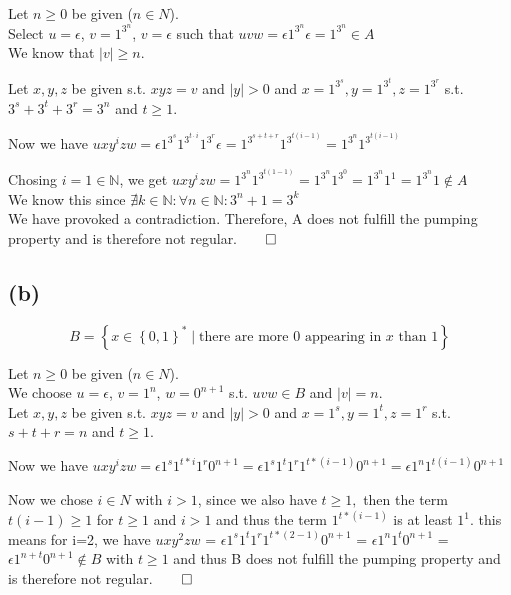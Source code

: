 Let $n \geq 0$ be given ($n \in N $).\\
Select $u = \epsilon$, $v=1^{3^{n}}$, $v=\epsilon$ such that $uvw = \epsilon 1^{3^{n}} \epsilon = 1^{3^{n}} \in A$\\
We know that $\lvert v \rvert \geq n$.

Let $x,y,z$ be given s.t. $xyz=v$ and $|y| > 0$ and $x=1^{3^{s}},y=1^{3^{t}},z=1^{3^{r}} $ s.t. $ 3^{s}+3^{t}+3^{r} = 3^{n} $ and $ t\geq 1$.

Now we have $uxy^izw = \epsilon 1^{3^{s}} 1^{3^{t\cdot i}} 1^{3^{r}} \epsilon = 1^{3^{s+t+r}} 1^{3^{t(i-1)}} = 1^{3^{n}}1^{3^{t(i-1)}}$

Chosing $i=1 \in \mathbb{N}$, we get $uxy^izw = 1^{3^{n}}1^{3^{t(1-1)}} = 1^{3^{n}}1^{3^{0}} = 1^{3^{n}}1^{1} = 1^{3^{n}}1 \notin A$\\
We know this since $\nexists k \in \mathbb{N}: \forall n \in \mathbb{N}: 3^{n} + 1 = 3^{k}$\\
We have provoked a contradiction. Therefore, A does not fulfill the pumping property and is therefore not regular.$\qed$

\subsection{(b)}

$$
B = \left\{ x \in \left\{0,1\right\}^{\ast} \mid \text{there are more }0\text{ appearing in }x\text{ than }1\right\}
$$

Let $n \geq 0$ be given ($n \in N $).\\
We choose $u = \epsilon$, $v= 1^n$, $w= 0^{n+1}$ s.t. $uvw \in B$ and $|v| = n$.\\
Let $x,y,z$ be given s.t. $xyz=v$ and $|y| > 0$ and $x=1^s,y=1^t,z=1^r $ s.t. $ s+t+r = n $ and $ t \geq 1$.

Now we have $uxy^izw = \epsilon 1^s 1^{t*i} 1^r 0^{n+1} = \epsilon 1^s 1^t 1^r 1^{t * (i-1)} 0^{n+1} = \epsilon 1^n 1^{t(i-1)}0^{n+1}$

Now we chose $i \in N$ with $i > 1$, since we also have $t \geq 1, $ then the term $t(i-1) \geq 1$ for $t \geq 1$ and $i > 1$ and thus the term $1^{t * (i-1)}$ is at least $1^1$. this means for i=2, we have  $uxy^2zw$ = $\epsilon 1^s 1^t 1^r 1^{t * (2-1)} 0^{n+1}$ = $\epsilon 1^n 1^{t}0^{n+1}$ = $\epsilon 1^{n + t}0^{n+1} \notin B$ with $t\geq1$ and thus B does not fulfill the pumping property and is therefore not regular.$\qed$


